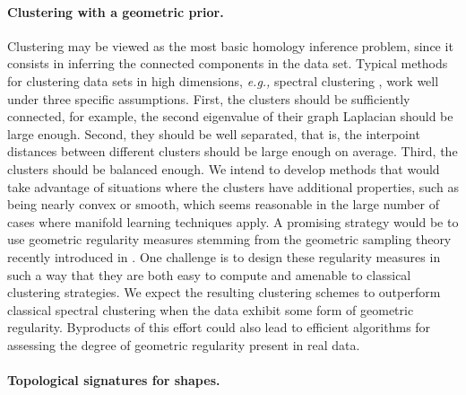 \paragraph{Clustering with a geometric prior.} %
Clustering may be viewed as the most basic homology inference problem, since it consists in inferring the connected components in the data set. Typical methods for clustering data sets in high dimensions, {\it e.g.,} spectral clustering \cite{sm-ncis-97}, work well under three specific assumptions. First, the clusters should be sufficiently connected, for example, the second eigenvalue of their graph Laplacian should be large enough. Second, they should be well separated, that is, the interpoint distances between different clusters should be large enough on average. Third, the clusters should be balanced enough. We intend to develop methods that would take advantage of situations where the clusters have additional properties, such as being nearly convex or smooth, which seems reasonable in the large number of cases where manifold learning techniques apply. A promising strategy would be to use geometric regularity measures stemming from the geometric sampling theory recently introduced in \cite{geometrica-ccl09}. One challenge is to design these regularity measures in such a way that they are both easy to compute and amenable to classical clustering strategies. We expect the resulting clustering schemes to outperform classical spectral clustering when the data exhibit some form of geometric regularity. Byproducts of this effort could also lead to efficient algorithms for assessing the degree of geometric regularity present in real data. 



\paragraph{Topological signatures for shapes.}


